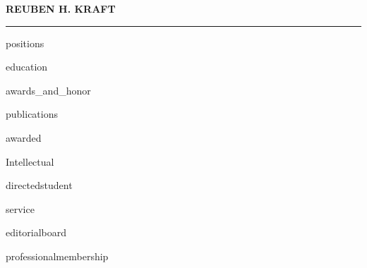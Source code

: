 \documentclass[a4paper,10pt]{article}
\author{}
\date{}
\begin{document}
\thispagestyle{firstpage}

\begin{center}
\LARGE \textbf{\textsc{REUBEN H. KRAFT}} \\
\rule{\linewidth}{2pt}
\end{center}
\normalsize

{{positions}}

{{education}}

{{awards_and_honor}}

{{publications}}

{{awarded}}

{{Intellectual}}

{{directedstudent}}

{{service}}

{{editorialboard}}

{{professionalmembership}}
\end{document}
